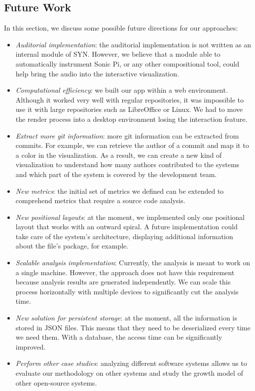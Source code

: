 \subsection*{Future Work}
In this section, we discuss some possible future directions for our approaches:
\begin{itemize}
    \item \textit{Auditorial implementation}: the auditorial implementation is not written as an internal module of SYN. However, we believe that a module able to automatically instrument Sonic Pi, or any other compositional tool, could help bring the audio into the interactive visualization. 
    \item \textit{Computational efficiency}: we built our app within a web environment. Although it worked very well with regular repositories, it was impossible to use it with large repositories such as LibreOffice or Linux. We had to move the render process into a desktop environment losing the interaction feature.
    \item \textit{Extract more git information}: more git information can be extracted from commits. For example, we can retrieve the author of a commit and map it to a color in the visualization. As a result, we can create a new kind of visualization to understand how many authors contributed to the systems and which part of the system is covered by the development team. 
    \item \textit{New metrics}: the initial set of metrics we defined can be extended to comprehend metrics that require a source code analysis.
    \item \textit{New positional layouts}: at the moment, we implemented only one positional layout that works with an outward spiral. A future implementation could take care of the system's architecture, displaying additional information about the file's package, for example.
    \item \textit{Scalable analysis implementation}: Currently, the analysis is meant to work on a single machine. However, the approach does not have this requirement because analysis results are generated independently. We can scale this process horizontally with multiple devices to significantly cut the analysis time. 
    \item \textit{New solution for persistent storage}: at the moment, all the information is stored in JSON files. This means that they need to be deserialized every time we need them. With a database, the access time can be significantly improved.
    \item \textit{Perform other case studies}: analyzing different software systems allows us to evaluate our methodology on other systems and study the growth model of other open-source systems. 
\end{itemize}

